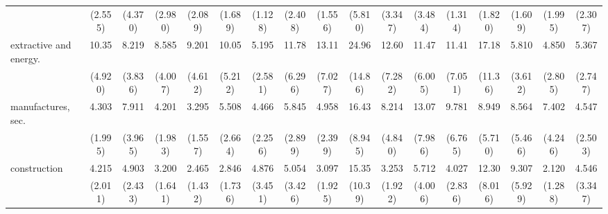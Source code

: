 {\begin{tabular}{l*{16}{c}}
                    &     (2.555)         &     (4.370)         &     (2.980)         &     (2.089)         &     (1.689)         &     (1.128)         &     (2.408)         &     (1.556)         &     (5.810)         &     (3.347)         &     (3.484)         &     (1.314)         &     (1.820)         &     (1.609)         &     (1.995)         &     (2.307)         \\
[1em]
extractive and energy.&       10.35\sym{***}&       8.219\sym{***}&       8.585\sym{***}&       9.201\sym{***}&       10.05\sym{***}&       5.195\sym{***}&       11.78\sym{***}&       13.11\sym{***}&       24.96\sym{***}&       12.60\sym{***}&       11.47\sym{***}&       11.41\sym{***}&       17.18\sym{***}&       5.810\sym{**} &       4.850\sym{**} &       5.367\sym{**} \\
                    &     (4.920)         &     (3.836)         &     (4.007)         &     (4.612)         &     (5.212)         &     (2.581)         &     (6.296)         &     (7.027)         &     (14.86)         &     (7.282)         &     (6.005)         &     (7.051)         &     (11.36)         &     (3.612)         &     (2.805)         &     (2.747)         \\
[1em]
manufactures, sec.  &       4.303\sym{**} &       7.911\sym{***}&       4.201\sym{**} &       3.295\sym{*}  &       5.508\sym{***}&       4.466\sym{**} &       5.845\sym{***}&       4.958\sym{***}&       16.43\sym{***}&       8.214\sym{***}&       13.07\sym{***}&       9.781\sym{***}&       8.949\sym{***}&       8.564\sym{***}&       7.402\sym{***}&       4.547\sym{**} \\
                    &     (1.995)         &     (3.965)         &     (1.983)         &     (1.557)         &     (2.664)         &     (2.256)         &     (2.899)         &     (2.399)         &     (8.945)         &     (4.840)         &     (7.986)         &     (6.765)         &     (5.710)         &     (5.466)         &     (4.246)         &     (2.503)         \\
[1em]
construction        &       4.215\sym{**} &       4.903\sym{**} &       3.200\sym{*}  &       2.465         &       2.846         &       4.876\sym{*}  &       5.054\sym{*}  &       3.097         &       15.35\sym{***}&       3.253\sym{*}  &       5.712\sym{*}  &       4.027\sym{*}  &       12.30\sym{***}&       9.307\sym{***}&       2.120         &       4.546\sym{*}  \\
                    &     (2.011)         &     (2.433)         &     (1.641)         &     (1.432)         &     (1.736)         &     (3.451)         &     (3.426)         &     (1.925)         &     (10.39)         &     (1.922)         &     (4.006)         &     (2.836)         &     (8.016)         &     (5.929)         &     (1.288)         &     (3.347)         \\

\end{tabular}}

